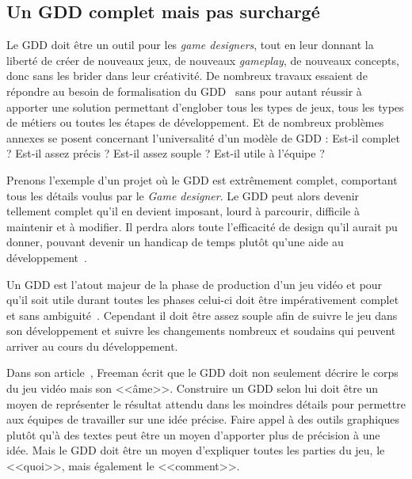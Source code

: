 \subsection{Un GDD complet mais pas surchargé}


Le GDD doit \^etre un outil pour les \emph{game designers}, tout en leur donnant la liberté de créer de nouveaux jeux, de nouveaux \emph{gameplay}, de nouveaux concepts, donc sans les brider dans leur cr\'eativit\'e. De nombreux travaux essaient de répondre au besoin de formalisation du GDD~\cite{GDD_software,multiview,GDD_GDProject,gama_greateGDD} sans pour autant réussir à apporter une solution permettant d'englober tous les types de jeux, tous les types de métiers ou toutes les étapes de développement. Et de nombreux problèmes annexes se posent concernant l'universalité d'un modèle de GDD : Est-il complet ? Est-il assez précis ? Est-il assez souple ? Est-il utile à l'équipe ? 

Prenons l'exemple d'un projet où le GDD est extrêmement complet, comportant tous les détails voulus par le \emph{Game designer}. Le GDD peut alors devenir tellement complet qu'il en devient imposant, lourd à parcourir, difficile à maintenir et à modifier. Il perdra alors toute l'efficacité de design qu'il aurait pu donner, pouvant devenir un handicap de temps plutôt qu'une aide au développement~\cite{onepage_librande}.

Un GDD est l'atout majeur de la phase de production d'un jeu vidéo et pour qu'il soit utile durant toutes les phases celui-ci doit être impérativement complet et sans ambiguité~\cite{GD_Guidelines}. Cependant il doit être assez souple afin de suivre le jeu dans son développement et suivre les changements nombreux et soudains qui peuvent arriver au cours du développement.

Dans son article~\cite{gama_greateGDD}, Freeman écrit que le GDD doit non seulement décrire le corps du jeu vidéo mais son <<âme>>. Construire un GDD selon lui doit être un moyen de représenter le résultat attendu dans les moindres détails pour permettre aux équipes de travailler sur une idée précise. Faire appel à des outils graphiques plutôt qu'à des textes peut être un moyen d'apporter plus de précision à une idée. Mais le GDD doit être un moyen d'expliquer toutes les parties du jeu, le <<quoi>>, mais également le <<comment>>.

